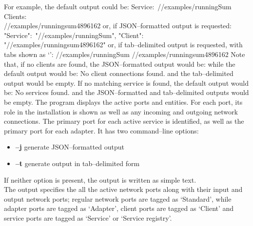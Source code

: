 For example, the default output could be:
\outputBegin{}
Service:\ /\serviceName/examples/runningSum\\
\settowidth{\utilLen}{Cli}%
Clients:\\
\hspace*{\utilLen}/\clientName/examples/runningsum\textunderscore{}4896162
\outputEnd{}
or, if JSON--formatted output is requested:
\outputBegin{}
\openSq{} \textbraceleft{} "Service":\ "/\serviceName/examples/runningSum", "Client":\ \\
"/\clientName/examples/runningsum\textunderscore{}4896162" \textbraceright{} \closeSq
\outputEnd{}
or, if tab--delimited output is requested, with tabs shown as
`\texttt{\boldmath{$\vdash$}}':
\outputBegin{}
/\serviceName/examples/runningSum\pseudotab{}%
/\clientName/examples/runningsum\textunderscore{}4896162
\outputEnd{}
Note that, if no clients are found, the JSON--formatted output would be:
\outputBegin{}
\sqPair
\outputEnd{}
while the default output would be:
\outputBegin{}
No client connections found.
\outputEnd{}
and the tab--delimited output would be empty.
If no matching service is found, the default output would be:
\outputBegin{}
No services found.
\outputEnd{}
and the JSON--formatted and tab--delimited outputs would be empty.
The program  displays the active \yarp{} ports and \mplusm{}
entities.
For each \yarp{} port, its role in the \mplusm{} installation is shown as well as any
incoming and outgoing \yarp{} network connections.
The primary port for each active service is identified, as well as the primary port for
each adapter.
It has two command--line options:
\begin{itemize}
\item \textbf{--j} generate JSON--formatted output
\item \textbf{--t} generate output in tab--delimited form
\end{itemize}
If neither option is present, the output is written as simple text.\\

The output specifies the all the active \yarp{} network ports along with their input and
output \yarp{} network ports; regular \yarp{} network ports are tagged as `Standard',
while \mplusm{} adapter ports are tagged as `Adapter', \mplusm{} client ports are tagged
as `Client' and \mplusm{} service ports are tagged as `Service' or `Service registry'.\\


